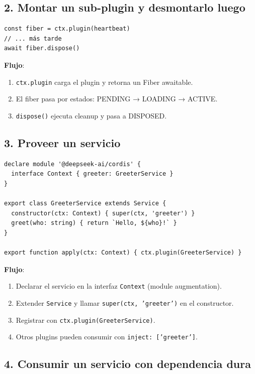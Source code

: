 \documentclass[11pt,a4paper]{article}
\begin{document}
\subsection*{2. Montar un sub-plugin y desmontarlo luego}


\begin{lstlisting}
const fiber = ctx.plugin(heartbeat)
// ... más tarde
await fiber.dispose()
\end{lstlisting}


\textbf{Flujo}:


\begin{enumerate}[leftmargin=*,topsep=2pt,itemsep=1pt]
  \item \texttt{ctx.plugin} carga el plugin y retorna un Fiber awaitable.
  \item El fiber pasa por estados: PENDING → LOADING → ACTIVE.
  \item \texttt{dispose()} ejecuta cleanup y pasa a DISPOSED.
\end{enumerate}


\subsection*{3. Proveer un servicio}


\begin{lstlisting}
declare module '@deepseek-ai/cordis' {
  interface Context { greeter: GreeterService }
}

export class GreeterService extends Service {
  constructor(ctx: Context) { super(ctx, 'greeter') }
  greet(who: string) { return `Hello, ${who}!` }
}

export function apply(ctx: Context) { ctx.plugin(GreeterService) }
\end{lstlisting}


\textbf{Flujo}:


\begin{enumerate}[leftmargin=*,topsep=2pt,itemsep=1pt]
  \item Declarar el servicio en la interfaz \texttt{Context} (module augmentation).
  \item Extender \texttt{Service} y llamar \texttt{super(ctx, 'greeter')} en el constructor.
  \item Registrar con \texttt{ctx.plugin(GreeterService)}.
  \item Otros plugins pueden consumir con \texttt{inject: ['greeter']}.
\end{enumerate}


\subsection*{4. Consumir un servicio con dependencia dura}
\end{document}
